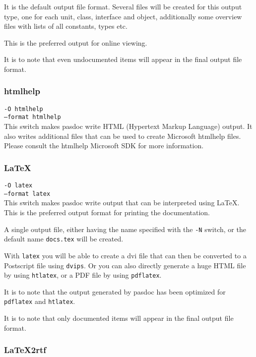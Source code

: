 \documentclass[11pt]{article}
\begin{document}
It is the default output file format. Several files will be created for 
this output type, one for each unit, class, interface and object, 
additionally some overview files with lists of all constants, types etc.

This is the preferred output for online viewing.

It is to note that even undocumented items will appear in the final
output file format.

\subsubsection{htmlhelp}

{\tt -O htmlhelp}\\
{\tt --format htmlhelp}\\

This switch makes pasdoc write HTML (Hypertext Markup Language) output.
It also writes additional files that can be used to create Microsoft
htmlhelp files. Please consult the htmlhelp Microsoft SDK for more 
information.

\subsubsection{\LaTeX}

{\tt -O latex}\\
{\tt --format latex}\\

This switch makes pasdoc write output that can be interpreted using
\LaTeX. This is the preferred output format for printing the 
documentation.

A single output file, either having the name specified with
the {\tt -N} switch, or the default name {\tt docs.tex} will
be created. 

With {\tt latex} you will be able to create a dvi file
that can then be converted to a Postscript file using 
{\tt dvips}. Or you can also directly generate a huge
HTML file by using {\tt htlatex}, or a PDF file
by using {\tt pdflatex}.

It is to note that the output generated by pasdoc has been 
optimized for {\tt pdflatex} and {\tt htlatex}.

It is to note that only documented items will appear in the final
output file format.


\subsubsection{LaTeX2rtf}
\end{document}
